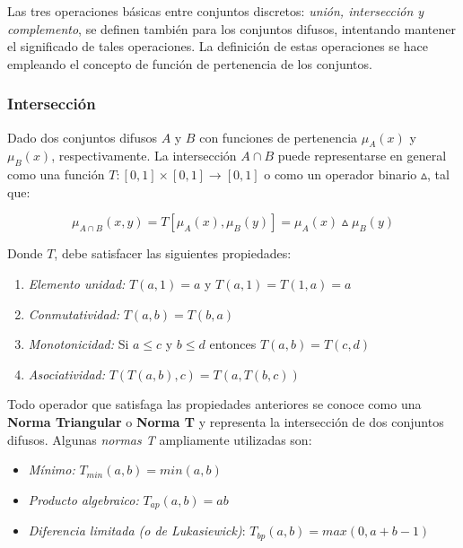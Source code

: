 Las tres operaciones básicas entre conjuntos discretos: \emph{unión, intersección y complemento}, se definen también para los conjuntos difusos, intentando mantener el significado de tales operaciones. La definición de estas operaciones se hace empleando el concepto de función de pertenencia de los conjuntos.

\subsubsection{Intersección}

Dado dos conjuntos difusos $A$ y $B$ con funciones de pertenencia $\mu_A(x)$ y $\mu_B(x)$, respectivamente.
La intersección $A \cap B$ puede representarse en general como una función
$T:[0,1] \times [0,1] \rightarrow [0,1]$ o como un operador binario $\vartriangle$, tal que:


\begin{displaymath}
\mu_{A \cap B}(x,y) = T [ \mu_A(x), \mu_B(y) ] = \mu_A(x) \vartriangle \mu_B(y)
\end{displaymath}

Donde $T$, debe satisfacer las siguientes propiedades:

\begin{enumerate}
	\item \textsl{Elemento unidad:} $T(a,1) = a$ y $T(a,1)=T(1,a)=a$
	\item \textsl{Conmutatividad:} $T(a,b) = T(b,a)$
	\item \textsl{Monotonicidad:} Si $a \leq c$ y $b \leq d$ entonces $T(a,b) = T(c,d)$
	\item \textsl{Asociatividad:} $T(T(a,b),c) = T(a,T(b,c))$
\end{enumerate}

Todo operador que satisfaga las propiedades anteriores se conoce como una \textbf{Norma Triangular} o \textbf{Norma T} y representa la intersección de dos conjuntos difusos. Algunas \textit{normas T} ampliamente utilizadas son:

\begin{itemize}
	\item \textsl{Mínimo:} $T_{min}(a,b) = min(a,b)$
	\item \textsl{Producto algebraico:} $T_{ap}(a,b) = ab$
	\item \textsl{Diferencia limitada (o de Lukasiewick)}: $T_{bp}(a,b) = max(0, a+b-1)$
\end{itemize}





